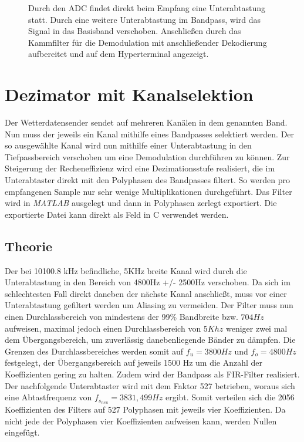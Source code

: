 \documentclass{article}
\begin{document}
\begin{figure}[!h]
    \centering
    \def\svgscale{0.5}
    \def\svgwidth{\columnwidth}
    \caption{Durch den ADC findet direkt beim Empfang eine Unterabtastung statt. Durch eine weitere Unterabtastung im Bandpass, wird das Signal in das Basisband verschoben.
    Anschließen durch das Kammfilter für die Demodulation mit anschließender Dekodierung aufbereitet und auf dem Hyperterminal angezeigt.}
    \label{fig:signal}
\end{figure}

\section{Dezimator mit Kanalselektion}\label{sec:FIR}
Der Wetterdatensender sendet auf mehreren Kanälen in dem genannten Band. Nun muss der jeweils ein Kanal mithilfe eines Bandpasses selektiert werden. Der so ausgewählte Kanal wird nun mithilfe einer Unterabtastung in den Tiefpassbereich verschoben um eine Demodulation durchführen zu können. Zur Steigerung der Recheneffizienz wird eine Dezimationsstufe realisiert, die im Unterabtaster direkt mit den Polyphasen des Bandpasses filtert. So werden pro empfangenen Sample nur sehr wenige Multiplikationen durchgeführt. Das Filter wird in \textit{MATLAB} ausgelegt und dann in Polyphasen zerlegt exportiert. Die exportierte Datei kann direkt als Feld in C verwendet werden.

\subsection{Theorie}
Der bei 10100.8 kHz befindliche, 5KHz breite Kanal wird durch die Unterabtastung in den Bereich von 4800Hz +/- 2500Hz verschoben. Da sich im schlechtesten Fall direkt daneben der nächste Kanal anschließt, muss vor einer Unterabtastung gefiltert werden um Aliasing zu vermeiden. Der Filter muss nun einen Durchlassbereich von mindestens der 99\% Bandbreite bzw. $704Hz$ aufweisen, maximal jedoch einen Durchlassbereich von $5Khz$ weniger zwei mal dem Übergangsbereich, um zuverlässig danebenliegende Bänder zu dämpfen. Die Grenzen des Durchlassbereiches werden somit auf $f_u = 3800Hz$ und $f_o = 4800Hz$ festgelegt, der Übergangsbereich auf jeweils 1500 Hz um die Anzahl der Koeffizienten gering zu halten. Zudem wird der Bandpass als FIR-Filter realisiert. Der nachfolgende Unterabtaster wird mit dem Faktor 527 betrieben, woraus sich eine Abtastfrequenz von $f_{s_{neu}} = 3831,499Hz$ ergibt. Somit verteilen sich die 2056 Koeffizienten des Filters auf 527 Polyphasen mit jeweils vier Koeffizienten. Da nicht jede der Polyphasen vier Koeffizienten aufweisen kann, werden Nullen eingefügt.
\end{document}
